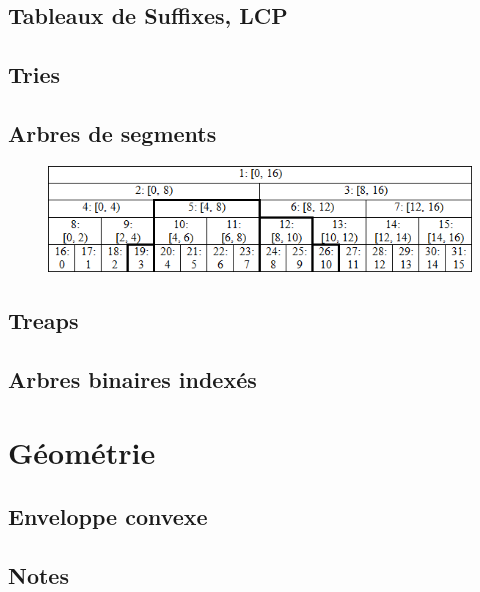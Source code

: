 \documentclass[10pt]{extarticle}
\begin{document}
\subsection{Tableaux de Suffixes, LCP}
{\scriptsize}

\subsection{Tries}
{\scriptsize}

\subsection{Arbres de segments}
\begin{figure}[h]
  \includegraphics{code/segtree.png}
\end{figure}
{\scriptsize}

\subsection{Treaps}
{\scriptsize}

\subsection{Arbres binaires indexés}
{\scriptsize}


\section{Géométrie}
\subsection{Enveloppe convexe}
{\scriptsize}

\subsection{Notes}

\end{document}
